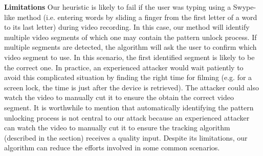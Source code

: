 \noindent \textbf{Limitations} Our heuristic is likely to fail if the user was typing
using a Swype-like method (i.e. entering words by sliding a finger from
the first letter of a word to its last letter) during video recording. In
this case, our method will identify multiple video segments of which one may contain
the pattern unlock process. If multiple segments are detected, the algorithm will ask the
user to confirm which video segment to use.
In this scenario, the first identified segment is likely to be the correct one.
In practice, an experienced attacker would wait patiently to avoid this
complicated situation by finding the right time for filming (e.g. for a screen
lock, the time is just after the device is retrieved).
The attacker could also watch the video to manually cut it to ensure the obtain the correct video segment.
It is
worthwhile to mention that automatically identifying the pattern unlocking process is
not central to our attack because an experienced attacker can watch the video to manually cut it to ensure the tracking algorithm (described in the section) receives a quality input.
Despite its limitations, our algorithm can reduce the efforts involved in some common scenarios.

